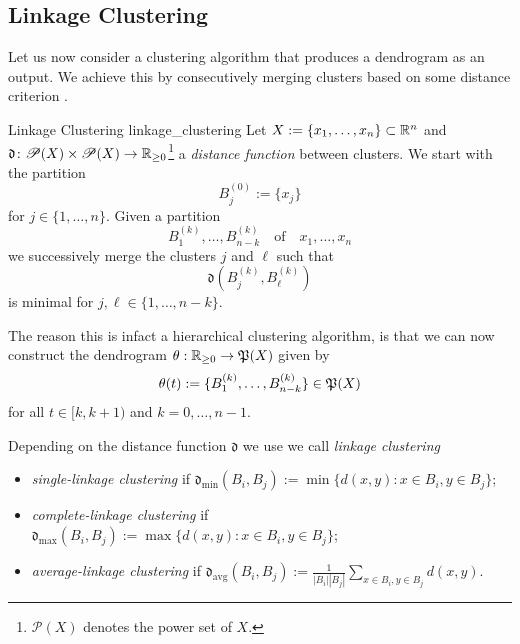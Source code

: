 \subsection{Linkage Clustering}
\label{section__linkage_clustering}
Let us now consider a clustering algorithm that produces a dendrogram as an output. We achieve this by consecutively merging clusters based on some distance criterion \cite[Sec.~4.2.2]{Everitt2011}.

\begin{definition}{Linkage Clustering }{linkage_clustering}
Let $X := \{x_1, \dots, x_n\} \subset \R^n$ and $\mathfrak{d}\colon\mathscr{P}(X) \times \mathscr{P}(X) \to \R_{\geq0}$\footnote{$\mathscr{P}(X)$ denotes the power set of $X$.} a \emph{distance function} between clusters. We start with the partition
$$
B^{(0)}_j := \{x_j\}$$
for $j \in \{1, \dots, n\}$. Given a partition
$$
B^{(k)}_1, \dots, B^{(k)}_{n - k} \quad \text{of} \quad x_1, \dots, x_n
$$
we successively merge the clusters $j$ and $\ell$ such that
$$
\mathfrak{d}(B^{(k)}_j,B^{(k)}_\ell)
$$
is minimal for $j,\ell \in \{1, \dots, n - k\}$.
\end{definition}
The reason this is infact a hierarchical clustering algorithm, is that we can now construct the dendrogram $\theta: \R_{\geq0} \to \P(X)$ given by
$$
\theta(t) := \{B_1^{(k)}, \dots, B_{n-k}^{(k)}\} \in \P(X)
$$
for all $t \in [k, k+1)$ and $k = 0, \dots, n-1$.


Depending on the distance function $\mathfrak{d}$ we use we call \emph{linkage clustering}

\begin{itemize}
    \item \emph{single-linkage clustering} if $\mathfrak{d}_\mathrm{min} (B_i, B_j) := \min\{d(x,y): x \in B_i, y \in B_j\}$;
    \item \emph{complete-linkage clustering} if $\mathfrak{d}_\mathrm{max} (B_i, B_j) := \max\{d(x,y): x \in B_i, y \in B_j\}$;
    \item \emph{average-linkage clustering} if $\mathfrak{d}_\mathrm{avg}(B_i,B_j) := \frac{1}{|B_i||B_j|} \sum_{x \in B_i, y \in B_j} d(x,y)$.
\end{itemize}


